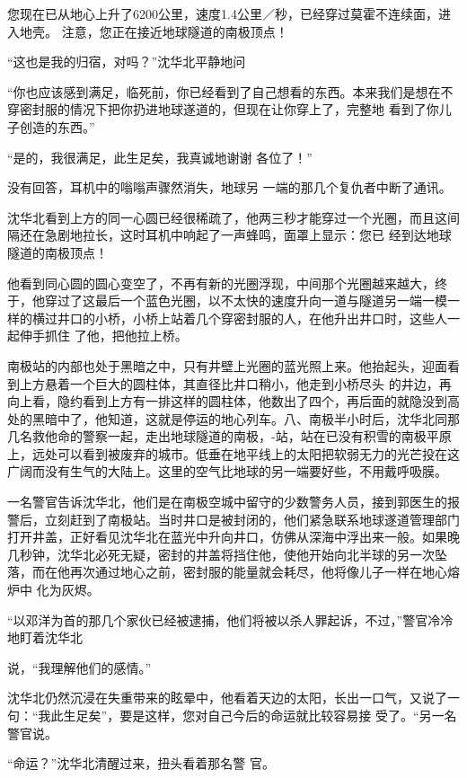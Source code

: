 \documentclass{article}
\begin{document}
您现在已从地心上升了6200公里，速度1.4公里／秒，已经穿过莫霍不连续面，进入地壳。
注意，您正在接近地球隧道的南极顶点！ 

“这也是我的归宿，对吗？”沈华北平静地问

“你也应该感到满足，临死前，你已经看到了自己想看的东西。本来我们是想在不穿密封服的情况下把你扔进地球遂道的，但现在让你穿上了，完整地
看到了你儿子创造的东西。” 

\newpage

“是的，我很满足，此生足矣，我真诚地谢谢
各位了！” 

没有回答，耳机中的嗡嗡声骤然消失，地球另
一端的那几个复仇者中断了通讯。 

沈华北看到上方的同一心圆已经很稀疏了，他两三秒才能穿过一个光圈，而且这间隔还在急剧地拉长，这时耳机中响起了一声蜂鸣，面罩上显示：您已
经到达地球隧道的南极顶点！ 

他看到同心圆的圆心变空了，不再有新的光圈浮现，中间那个光圈越来越大，终于，他穿过了这最后一个蓝色光圈，以不太快的速度升向一道与隧道另一端一模一样的横过井口的小桥，小桥上站着几个穿密封服的人，在他升出井口时，这些人一起伸手抓住
了他，把他拉上桥。 

南极站的内部也处于黑暗之中，只有井壁上光圈的蓝光照上来。他抬起头，迎面看到上方悬着一个巨大的圆柱体，其直径比井口稍小，他走到小桥尽头
\newpage
的井边，再向上看，隐约看到上方有一排这样的圆柱体，他数出了四个，再后面的就隐没到高处的黑暗中了，他知道，这就是停运的地心列车。八、南极半小时后，沈华北同那几名救他命的警察一起，走出地球隧道的南极，-站，站在已没有积雪的南极平原上，远处可以看到被废弃的城市。低垂在地平线上的太阳把软弱无力的光芒投在这广阔而没有生气的大陆上。这里的空气比地球的另一端要好些，不用戴呼吸膜。

一名警官告诉沈华北，他们是在南极空城中留守的少数警务人员，接到郭医生的报警后，立刻赶到了南极站。当时井口是被封闭的，他们紧急联系地球遂道管理部门打开井盖，正好看见沈华北在蓝光中升向井口，仿佛从深海中浮出来一般。如果晚几秒钟，沈华北必死无疑，密封的井盖将挡住他，使他开始向北半球的另一次坠落，而在他再次通过地心之前，密封服的能量就会耗尽，他将像儿子一样在地心熔炉中
化为灰烬。 

“以邓洋为首的那几个家伙已经被逮捕，他们将被以杀人罪起诉，不过，”警官冷冷地盯着沈华北
\newpage

说，“我理解他们的感情。” 

沈华北仍然沉浸在失重带来的眩晕中，他看着天边的太阳，长出一口气，又说了一句：“我此生足矣”，要是这样，您对自己今后的命运就比较容易接
受了。“另一名警官说。 

“命运？”沈华北清醒过来，扭头看着那名警
官。 
\end{document}
